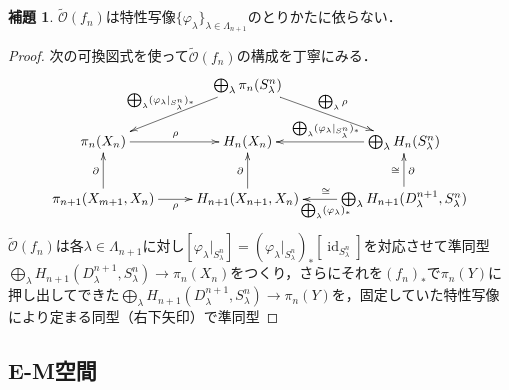 \documentclass[a4paper,11pt]{jsarticle}
\theoremstyle{definition}
\newtheorem{lem}[thm]{補題}
\DeclareMathOperator{\id}{\mathrm{id}}
\begin{document}
\begin{lem}
  $\tilde{\mathcal{O}}(f_n)$は特性写像$\{\varphi_\lambda\}_{\lambda\in\Lambda_{n+1}}$のとりかたに依らない．
\end{lem}
\begin{proof}
  次の可換図式を使って$\tilde{\mathcal{O}}(f_n)$の構成を丁寧にみる．\[
  \xymatrix{
    &\bigoplus_\lambda\pi_n(S^n_\lambda)\ar[ld]_{\bigoplus_\lambda(\varphi_\lambda|_{S^n_\lambda})_*}\ar[rd]^{\bigoplus_\lambda\rho}&\\
    \pi_n(X_n)\ar[r]^\rho & 
    H_n(X_n)  & 
    \bigoplus_\lambda H_n(S^n_\lambda)\ar[l]_{\bigoplus_\lambda(\varphi_\lambda|_{S^n_\lambda})_*}\\
    \pi_{n+1}(X_{m+1},X_n)\ar[u]^{\partial}\ar[r]_\rho & 
    H_{n+1}(X_{n+1},X_n)\ar[u]^\partial & 
    \bigoplus_\lambda H_{n+1}(D^{n+1}_\lambda,S^n_\lambda)\ar[u]_\partial^\cong\ar[l]^{\bigoplus_\lambda (\varphi_\lambda)_*}_\cong
  }\]
  $\tilde{\mathcal{O}}(f_n)$は各$\lambda\in\Lambda_{n+1}$に対し$[\varphi_\lambda|_{S^n_\lambda}]=(\varphi_\lambda|_{S^n_\lambda})_*[\id_{S^n_\lambda}]$を対応させて準同型$\bigoplus_\lambda H_{n+1}(D^{n+1}_\lambda,S^n_\lambda)\to \pi_n(X_n)$をつくり，さらにそれを$(f_n)_*$で$\pi_n(Y)$に押し出してできた$\bigoplus_\lambda H_{n+1}(D^{n+1}_\lambda,S^n_\lambda)\to \pi_n(Y)$を，固定していた特性写像により定まる同型（右下矢印）で準同型
\end{proof}
\subsection{E-M空間}




\printindex
\end{document}
